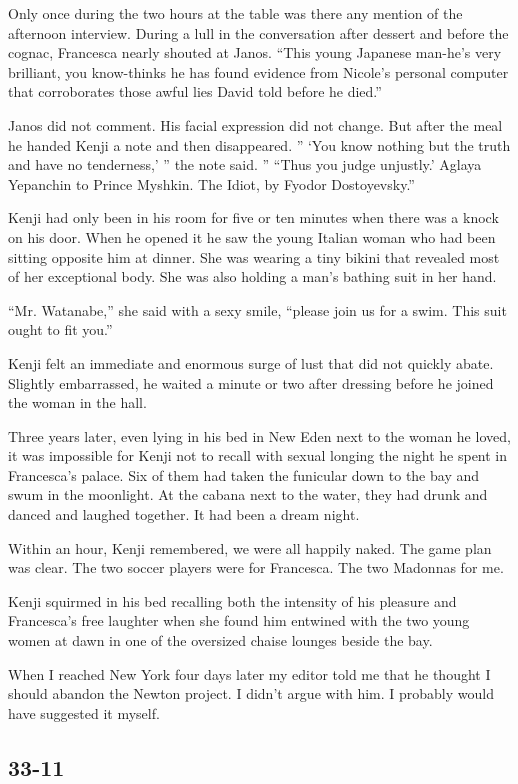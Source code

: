 \documentclass[]{article}
\begin{document}
{Only once during the two hours at the table was there any mention of the afternoon interview.  During a lull in the conversation after dessert and before the cognac, Francesca nearly shouted at Janos.  “This young Japanese man-he’s very brilliant, you know-thinks he has found evidence from Nicole’s personal computer that corroborates those awful lies David told before he died.”

Janos did not comment.  His facial expression did not change.  But after the meal he handed Kenji a note and then disappeared.  ” ‘You know nothing but the truth and have no tenderness,’ ” the note said.  ” “Thus you judge unjustly.’ Aglaya Yepanchin to Prince Myshkin.  The Idiot, by Fyodor Dostoyevsky.”

Kenji had only been in his room for five or ten minutes when there was a knock on his door.  When he opened it he saw the young Italian woman who had been sitting opposite him at dinner.  She was wearing a tiny bikini that revealed most of her exceptional body.  She was also holding a man’s bathing suit in her hand.

“Mr.  Watanabe,” she said with a sexy smile, “please join us for a swim.  This suit ought to fit you.”

Kenji felt an immediate and enormous surge of lust that did not quickly abate.  Slightly embarrassed, he waited a minute or two after dressing before he joined the woman in the hall.

Three years later, even lying in his bed in New Eden next to the woman he loved, it was impossible for Kenji not to recall with sexual longing the night he spent in Francesca’s palace.  Six of them had taken the funicular down to the bay and swum in the moonlight.  At the cabana next to the water, they had drunk and danced and laughed together.  It had been a dream night.

Within an hour, Kenji remembered, we were all happily naked.  The game plan was clear.  The two soccer players were for Francesca.  The two Madonnas for me.

Kenji squirmed in his bed recalling both the intensity of his pleasure and Francesca’s free laughter when she found him entwined with the two young women at dawn in one of the oversized chaise lounges beside the bay.

When I reached New York four days later my editor told me that he thought I should abandon the Newton project.  I didn’t argue with him.  I probably would have suggested it myself.


\subsection*{33-11}

}
\end{document}
